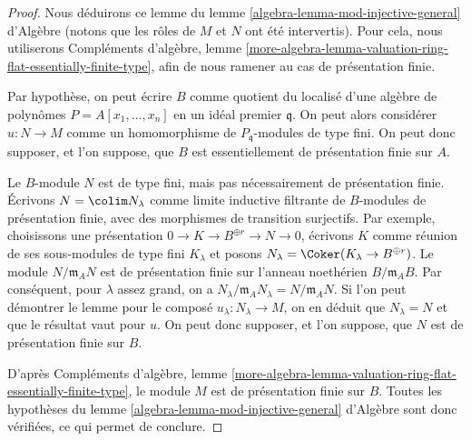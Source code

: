 \begin{proof}
Nous déduirons ce lemme du
lemme \ref{algebra-lemma-mod-injective-general} d'Algèbre
(notons que les rôles de $M$ et $N$ ont été intervertis).
Pour cela, nous utiliserons Compléments d'algèbre, lemme
\ref{more-algebra-lemma-valuation-ring-flat-essentially-finite-type},
afin de nous ramener au cas de présentation finie.

\medskip\noindent
Par hypothèse, on peut écrire $B$ comme quotient du localisé d'une
algèbre de polynômes $P = A[x_1, \ldots, x_n]$ en un idéal premier
$\mathfrak q$. On peut alors considérer $u : N \to M$ comme un homomorphisme
de $P_\mathfrak q$-modules de type fini. On peut donc supposer, et l'on suppose,
que $B$ est essentiellement de présentation finie sur $A$.

\medskip\noindent
Le $B$-module $N$ est de type fini, mais pas nécessairement de présentation finie.
Écrivons $N = \colim N_\lambda$ comme limite inductive filtrante de
$B$-modules de présentation finie, avec des morphismes de transition surjectifs.
Par exemple, choisissons une présentation
$0 \to K \to B^{\oplus r} \to N \to 0$,
écrivons $K$ comme réunion de ses sous-modules de type fini $K_\lambda$ et
posons $N_\lambda = \Coker(K_\lambda \to B^{\oplus r})$.
Le module $N/\mathfrak m_A N$ est de présentation finie
sur l'anneau noethérien $B/\mathfrak m_A B$.
Par conséquent, pour $\lambda$ assez grand, on a
$N_\lambda/\mathfrak m_A N_\lambda = N/\mathfrak m_A N$.
Si l'on peut démontrer le lemme pour le composé
$u_\lambda : N_\lambda \to M$, on en déduit que
$N_\lambda = N$ et que le résultat vaut pour $u$.
On peut donc supposer, et l'on suppose, que $N$ est de présentation finie sur $B$.

\medskip\noindent
D'après Compléments d'algèbre, lemme
\ref{more-algebra-lemma-valuation-ring-flat-essentially-finite-type},
le module $M$ est de présentation finie sur $B$.
Toutes les hypothèses du
lemme \ref{algebra-lemma-mod-injective-general} d'Algèbre
sont donc vérifiées, ce qui permet de conclure.
\end{proof}

